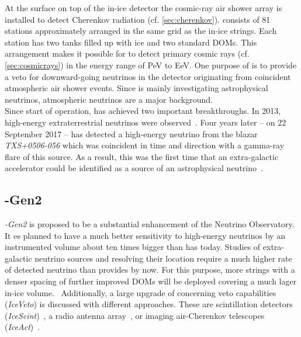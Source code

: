 At the surface on top of the in-ice detector the cosmic-ray air shower array \icetop is installed to detect Cherenkov radiation (cf. \ref{sec:cherenkov}). \icetop consists of 81 stations approximately arranged in the same grid as the in-ice strings. Each station has two tanks filled up with ice and two standard \icecube DOMs. This arrangement makes it possible for \icetop to detect primary cosmic rays (cf. \ref{sec:cosmicrays}) in the energy range of \si{\peta\electronvolt} to \si{\exa\electronvolt}. One purpose of \icetop is to provide a veto for downward-going neutrinos in the \icecube detector originating from coincident atmospheric air shower events. \cite{icecube:instrumentation} Since \icecube is mainly investigating astrophysical neutrinos, atmospheric neutrinos are a major background.\\

Since start of operation, \icecube has achieved two important breakthroughs. In 2013, high-energy extraterrestrial neutrinos were observed~\cite{icecube:he_neutrino}. Four years later -- on \num{22} September 2017 -- \icecube has detected a high-energy neutrino from the blazar \textit{TXS+0506-056} which was coincident in time and direction with a gamma-ray flare of this source. As a result, this was the first time that an extra-galactic accelerator could be identified as a source of an astrophysical neutrino~\cite{icecube:txs}.

\subsection{\icecube-Gen2}

\textit{\icecube-Gen2} is proposed to be a substantial enhancement of the \icecube Neutrino Observatory. It es planned to have a much better sensitivity to high-energy neutrinos by an instrumented volume about ten times bigger than \icecube has today. Studies of extra-galactic neutrino sources and resolving their location require a much higher rate of detected neutrino than \icecube provides by now. For this purpose, more strings with a denser spacing of further improved DOMs will be deployed covering a much lager in-ice volume.~\cite{icecube:iceact,icecube:gen2} Additionally, a large upgrade of \icetop concerning veto capabilities (\textit{IceVeto}) is discussed with different approaches. These are scintillation detectors (\textit{IceScint})~\cite{icecube:gen2:icescint}, a radio antenna array~\cite{icecube:gen2:radio}, or imaging air-Cherenkov telescopes (\textit{IceAct})~\cite{iacts:extension,icecube:iceact}.

